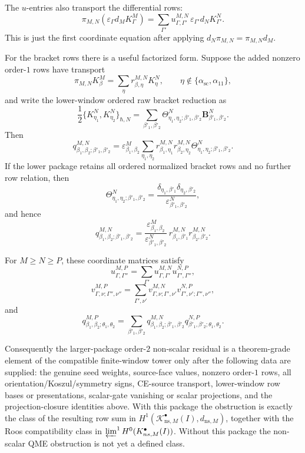 \begin{prop}
  The \(u\)-entries also transport the differential rows:
  \[
    \pi_{M,N}(\varepsilon_\Gamma d_MK^M_\Gamma)
      =
    \sum_{\Gamma'}
      u^{M,N}_{\Gamma,\Gamma'}\,
      \varepsilon_{\Gamma'}d_NK^N_{\Gamma'}.
  \]
  This is just the first coordinate equation after applying
  \(d_N\pi_{M,N}=\pi_{M,N}d_M\).

  For the bracket rows there is a useful factorized form.  Suppose the
  added nonzero order-\(1\) rows have transport
  \[
    \pi_{M,N}K^M_\beta
      =
    \sum_{\eta}r^{M,N}_{\beta,\eta}K^N_\eta,
    \qquad
    \eta\notin\{\alpha_{\mathrm{sc}},\alpha_{11}\},
  \]
  and write the lower-window ordered raw bracket reduction as
  \[
    \frac12\{K^N_{\eta_1},K^N_{\eta_2}\}_{\hbar,N}
      =
    \sum_{\beta'_1,\beta'_2}
      \Theta^N_{\eta_1,\eta_2;\beta'_1,\beta'_2}
      \mathbf B^N_{\beta'_1,\beta'_2}.
  \]
  Then
  \[
    q^{M,N}_{\beta_1,\beta_2;\beta'_1,\beta'_2}
      =
    \varepsilon^M_{\beta_1,\beta_2}
    \sum_{\eta_1,\eta_2}
      r^{M,N}_{\beta_1,\eta_1}
      r^{M,N}_{\beta_2,\eta_2}
      \Theta^N_{\eta_1,\eta_2;\beta'_1,\beta'_2}.
  \]
  If the lower package retains all ordered normalized bracket rows and no
  further row relation, then
  \[
    \Theta^N_{\eta_1,\eta_2;\beta'_1,\beta'_2}
      =
    \frac{
      \delta_{\eta_1,\beta'_1}\delta_{\eta_2,\beta'_2}
    }{\varepsilon^N_{\beta'_1,\beta'_2}},
  \]
  and hence
  \[
    q^{M,N}_{\beta_1,\beta_2;\beta'_1,\beta'_2}
      =
    \frac{\varepsilon^M_{\beta_1,\beta_2}}
         {\varepsilon^N_{\beta'_1,\beta'_2}}\,
    r^{M,N}_{\beta_1,\beta'_1}
    r^{M,N}_{\beta_2,\beta'_2}.
  \]

  For \(M\geq N\geq P\), these coordinate matrices satisfy
  \[
    u^{M,P}_{\Gamma,\Gamma''}
      =
    \sum_{\Gamma'}
      u^{M,N}_{\Gamma,\Gamma'}u^{N,P}_{\Gamma',\Gamma''},
  \]
  \[
    v^{M,P}_{\Gamma,\nu;\Gamma'',\nu''}
      =
    \sum_{\Gamma',\nu'}
      v^{M,N}_{\Gamma,\nu;\Gamma',\nu'}
      v^{N,P}_{\Gamma',\nu';\Gamma'',\nu''},
  \]
  and
  \[
    q^{M,P}_{\beta_1,\beta_2;\theta_1,\theta_2}
      =
    \sum_{\beta'_1,\beta'_2}
      q^{M,N}_{\beta_1,\beta_2;\beta'_1,\beta'_2}
      q^{N,P}_{\beta'_1,\beta'_2;\theta_1,\theta_2}.
  \]

  Consequently the larger-package order-\(2\) non-scalar residual is a
  theorem-grade element of the compatible finite-window tower only after
  the following data are supplied: the genuine seed weights, source-face
  values, nonzero order-\(1\) rows, all orientation/Koszul/symmetry signs,
  CE-source transport, lower-window row bases or presentations, scalar-gate
  vanishing or scalar projections, and the projection-closure identities
  above.  With this package the obstruction is exactly the class of the
  resulting row sum in
  \(H^1(\mathcal K^\bullet_{\mathrm{ns},M}(I),d_{\mathrm{ns},M})\),
  together with the Roos compatibility class in
  \(\varprojlim^1 H^0(\mathcal K^\bullet_{\mathrm{ns},M}(I))\).  Without
  this package the non-scalar QME obstruction is not yet a defined class.
\end{prop}

